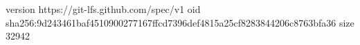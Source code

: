 version https://git-lfs.github.com/spec/v1
oid sha256:9d243461baf4510900277167ffcd7396def4815a25cf8283844206c8763bfa36
size 32942
